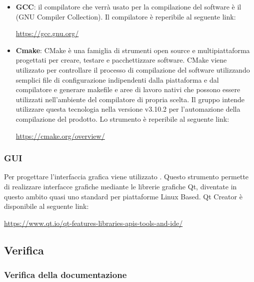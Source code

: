 \documentclass[../NormediProgetto.tex]{subfiles}
\begin{document}
	\begin{itemize}
		\item \textbf{GCC}: il compilatore che verrà usato per la compilazione del software è il  (GNU Compiler Collection). Il compilatore è reperibile al seguente link:
		\begin{center}
			\centerline{\url{https://gcc.gnu.org/}}
		\end{center}
	
		\item \textbf{Cmake}: CMake è una famiglia di strumenti open source e multipiattaforma progettati per creare, testare e pacchettizzare software. CMake viene utilizzato per controllare il processo di compilazione del software utilizzando semplici file di configurazione indipendenti dalla piattaforma e dal compilatore e generare makefile e aree di lavoro nativi che possono essere utilizzati nell'ambiente del compilatore di propria scelta. Il gruppo intende utilizzare questa tecnologia nella versione v3.10.2 per l’automazione della compilazione del prodotto. Lo strumento è reperibile al seguente link:
		\begin{center}
			\centerline{\url{https://cmake.org/overview/}}
		\end{center}
	
	\end{itemize}

	\subsubsection{GUI}

	Per progettare l'interfaccia grafica viene utilizzato . Questo strumento permette di realizzare interfacce grafiche mediante le librerie grafiche Qt, diventate in questo ambito quasi uno standard per piattaforme Linux Based. Qt Creator è disponibile al seguente link: 
	\begin{center}
		\centerline{\url{https://www.qt.io/qt-features-libraries-apis-tools-and-ide/}}
	\end{center}
	
	
	\subsection{Verifica}
	
	\subsubsection{Verifica della documentazione}
	
\end{document}
